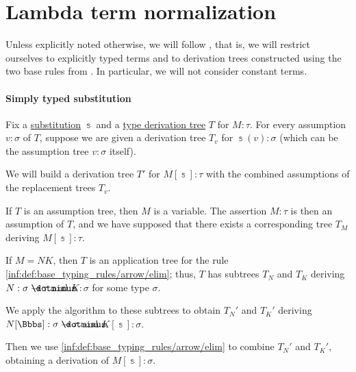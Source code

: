 \section{Lambda term normalization}\label{sec:lambda_term_normalization}

Unless explicitly noted otherwise, we will follow , that is, we will restrict ourselves to explicitly typed terms and to derivation trees constructed using the two base rules from . In particular, we will not consider constant terms.

\paragraph{Simply typed substitution}

\begin{algorithm}\label{alg:simply_typed_substitution}
  Fix a \hyperref[def:lambda_substitution]{substitution} \( \Bbbs \) and a \hyperref[def:type_derivation_tree]{type derivation tree} \( T \) for \( M: \tau \). For every assumption \( v: \sigma \) of \( T \), suppose we are given a derivation tree \( T_v \) for \( \Bbbs(v): \sigma \) (which can be the assumption tree \( v: \sigma \) itself).

  We will build a derivation tree \( T' \) for \( M[\Bbbs]: \tau \) with the combined assumptions of the replacement trees \( T_v \).

  \begin{thmenum}
     If \( T \) is an assumption tree, then \( M \) is a variable. The assertion \( M: \tau \) is then an assumption of \( T \), and we have supposed that there exists a corresponding tree \( T_M \) deriving \( M[\Bbbs]: \tau \).

     If \( M = NK \), then \( T \) is an application tree for the rule \ref{inf:def:base_typing_rules/arrow/elim}; thus, \( T \) has subtrees \( T_N \) and \( T_K \) deriving \( N: \sigma \synimplies \tau \) and \( K: \sigma \) for some type \( \sigma \).

    We apply the algorithm to these subtrees to obtain \( T_N' \) and \( T_K' \) deriving \( N[\Bbbs]: \sigma \synimplies \tau \) and \( K[\Bbbs]: \sigma \).

    Then we use \ref{inf:def:base_typing_rules/arrow/elim} to combine \( T_N' \) and \( T_K' \), obtaining a derivation of \( M[\Bbbs]: \sigma \).


\end{thmenum}
\end{algorithm}
